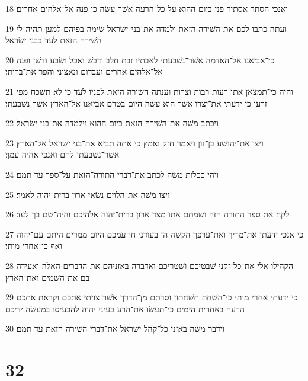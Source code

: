 \par 18 ואנכי הסתר אסתיר פני ביום ההוא על כל־הרעה אשׁר עשׂה כי פנה אל־אלהים אחרים׃
\par 19 ועתה כתבו לכם את־השׁירה הזאת ולמדה את־בני־ישׂראל שׂימה בפיהם למען תהיה־לי השׁירה הזאת לעד בבני ישׂראל׃
\par 20 כי־אביאנו אל־האדמה אשׁר־נשׁבעתי לאבתיו זבת חלב ודבשׁ ואכל ושׂבע ודשׁן ופנה אל־אלהים אחרים ועבדום ונאצוני והפר את־בריתי׃
\par 21 והיה כי־תמצאן אתו רעות רבות וצרות וענתה השׁירה הזאת לפניו לעד כי לא תשׁכח מפי זרעו כי ידעתי את־יצרו אשׁר הוא עשׂה היום בטרם אביאנו אל־הארץ אשׁר נשׁבעתי׃
\par 22 ויכתב משׁה את־השׁירה הזאת ביום ההוא וילמדה את־בני ישׂראל׃
\par 23 ויצו את־יהושׁע בן־נון ויאמר חזק ואמץ כי אתה תביא את־בני ישׂראל אל־הארץ אשׁר־נשׁבעתי להם ואנכי אהיה עמך׃
\par 24 ויהי ככלות משׁה לכתב את־דברי התורה־הזאת על־ספר עד תמם׃
\par 25 ויצו משׁה את־הלוים נשׂאי ארון ברית־יהוה לאמר׃
\par 26 לקח את ספר התורה הזה ושׂמתם אתו מצד ארון ברית־יהוה אלהיכם והיה־שׁם בך לעד׃
\par 27 כי אנכי ידעתי את־מריך ואת־ערפך הקשׁה הן בעודני חי עמכם היום ממרים היתם עם־יהוה ואף כי־אחרי מותי׃
\par 28 הקהילו אלי את־כל־זקני שׁבטיכם ושׁטריכם ואדברה באזניהם את הדברים האלה ואעידה בם את־השׁמים ואת־הארץ׃
\par 29 כי ידעתי אחרי מותי כי־השׁחת תשׁחתון וסרתם מן־הדרך אשׁר צויתי אתכם וקראת אתכם הרעה באחרית הימים כי־תעשׂו את־הרע בעיני יהוה להכעיסו במעשׂה ידיכם׃
\par 30 וידבר משׁה באזני כל־קהל ישׂראל את־דברי השׁירה הזאת עד תמם׃

\chapter{32}

